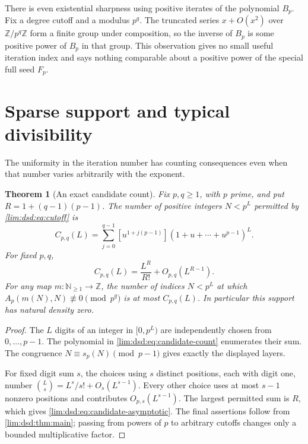 \documentclass[11pt]{article}
\newtheorem{theorem}{Theorem}[section]
\theoremstyle{definition}
\theoremstyle{remark}
\newcommand{\Z}{\mathbb Z}
\newcommand{\N}{\mathbb N}
\begin{document}
There is even existential sharpness using positive iterates of the
polynomial $B_p$. Fix a degree cutoff and a modulus $p^q$. The
truncated series $x+O(x^2)$ over $\Z/p^q\Z$ form a finite group
under composition, so the inverse of $B_p$ is some positive power
of $B_p$ in that group. This observation gives no small useful
iteration index and says nothing comparable about a positive power
of the special full seed $F_p$.

\section{Sparse support and typical divisibility}
\label{lim:dsd:sec:sparsity}

The uniformity in the iteration number has counting consequences
even when that number varies arbitrarily with the exponent.

\begin{theorem}[An exact candidate count]
\label{lim:dsd:thm:sparse}
Fix $p,q\ge1$, with $p$ prime, and put
$R=1+(q-1)(p-1)$. The number of positive integers $N<p^L$
permitted by \eqref{lim:dsd:eq:cutoff} is
\begin{equation}
 C_{p,q}(L)=\sum_{j=0}^{q-1}
 [u^{1+j(p-1)}](1+u+\cdots+u^{p-1})^L.
 \label{lim:dsd:eq:candidate-count}
\end{equation}
For fixed $p,q$,
\begin{equation}
 C_{p,q}(L)=\frac{L^R}{R!}+O_{p,q}(L^{R-1}).
 \label{lim:dsd:eq:candidate-asymptotic}
\end{equation}
For any map $m:\N_{\ge1}\to\Z$, the number of indices $N<p^L$
at which $A_p(m(N),N)\not\equiv0\pmod{p^q}$ is at most
$C_{p,q}(L)$. In particular this support has natural density zero.
\end{theorem}
\begin{proof}
The $L$ digits of an integer in $[0,p^L)$ are independently
chosen from $0,\ldots,p-1$. The polynomial in
\eqref{lim:dsd:eq:candidate-count} enumerates their sum. The congruence
$N\equiv s_p(N)\pmod{p-1}$ gives exactly the displayed layers.

For fixed digit sum $s$, the choices using $s$ distinct positions,
each with digit one, number $\binom Ls=L^s/s!+O_s(L^{s-1})$.
Every other choice uses at most $s-1$ nonzero positions and
contributes $O_{p,s}(L^{s-1})$. The largest permitted sum is $R$,
which gives \eqref{lim:dsd:eq:candidate-asymptotic}. The final assertions
follow from \cref{lim:dsd:thm:main}; passing from powers of $p$ to arbitrary
cutoffs changes only a bounded multiplicative factor.
\end{proof}
\end{document}
